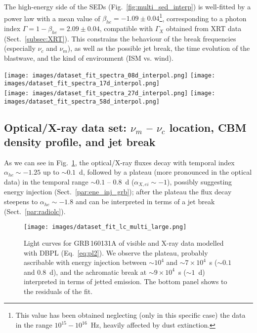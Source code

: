 \documentclass{aa}
\begin{document}
The high-energy side of the SEDs (Fig.~\ref{fig:multi_sed_interp}) is well-fitted by a power law with a mean value of $\beta_{he} = -1.09 \pm 0.04$\footnote{This value has been obtained neglecting (only in this specific case) the data in the range $10^{15}-10^{16}$~Hz, heavily affected by dust extinction.}, corresponding to a photon index $\Gamma = 1 - \beta_{he} = 2.09 \pm 0.04$, compatible with $\Gamma_X$ obtained from XRT data (Sect.~\ref{subsec:XRT}).
This constrains the behaviour of the break frequencies (especially $\nu_c$ and $\nu_m$), as well as the possible jet break, the time evolution of the blastwave, and the kind of environment (ISM vs. wind).
%
\begin{figure*} %
\centering
{\texttt{[image: images/dataset\_fit\_spectra\_08d\_interpol.png]}} \quad
{\texttt{[image: images/dataset\_fit\_spectra\_17d\_interpol.png]}} \\
{\texttt{[image: images/dataset\_fit\_spectra\_27d\_interpol.png]}} \quad
{\texttt{[image: images/dataset\_fit\_spectra\_58d\_interpol.png]}} \\
\caption{Broadband SEDs of GRB\,160131A at $0.8$~d (top left), $1.7$~d (top right), $2.7$~d (bottom left), and $5.8$~d (bottom right).
Blue (red) points are measured (linearly interpolated in a log-log plot) data.
These SEDs display radio peaks (at $0.8$~d, $1.7$~d, and $5.8$~d) and dust extinction (red shaded regions, especially at $0.8$~d).
Green dashed line shows the resulting modelling of the high-energy data (optical/X-ray).
Filled circles indicate detections, and upside down triangles indicate $3\sigma$ upper limits.
}
\label{fig:multi_sed_interp}
\end{figure*}


\subsection{Optical/X-ray data set: $\nu_{m}$ -- $\nu_c$ location, CBM density profile, and jet break}
\label{par:breaks}

As we can see in Fig.~\ref{fig:ene_in}, the optical/X-ray fluxes decay with temporal index $\alpha_{he} \sim -1.25$ up to $\sim 0.1$~d, followed by a plateau (more pronounced in the optical data) in the temporal range $\sim 0.1$ -- $0.8$~d ($\alpha_{X,ei} \sim -1$), possibly suggesting energy injection (Sect.~\ref{par:ene_inj_grb}); after the plateau the flux decay steepens to $\alpha_{he} \sim -1.8$ and can be interpreted in terms of a jet break (Sect.~\ref{par:radiolc}).
%
\begin{figure} %
\centering
{\texttt{[image: images/dataset\_fit\_lc\_multi\_large.png]}}
\caption{Light curves for GRB\,160131A of visible and X-ray data modelled with DBPL (Eq.~\ref{eq:pl2}).
We observe the plateau, probably ascribable with energy injection between $\sim 10^4$ and $\sim 7 \times 10^4$~s ($\sim 0.1$ and $0.8$~d), and the achromatic break at $\sim 9 \times 10^4$~s ($\sim 1$~d) interpreted in terms of jetted emission.
The bottom panel shows to the residuals of the fit.}
\label{fig:ene_in}
\end{figure}
\end{document}
